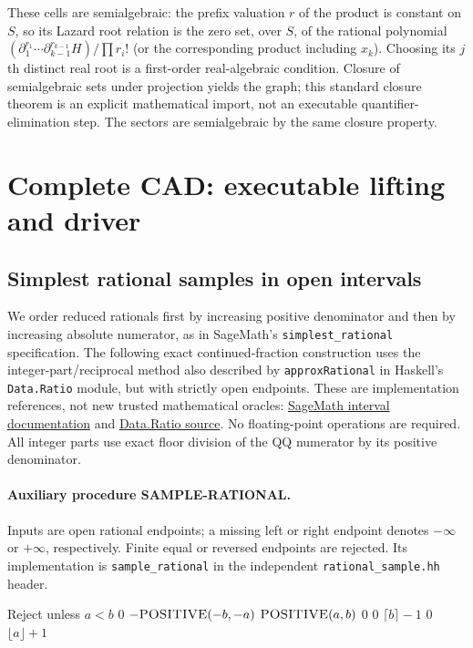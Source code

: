 \documentclass[11pt]{article}
\theoremstyle{definition}
\newcommand{\alg}[1]{\textsc{#1}}
\begin{document}
These cells are semialgebraic: the prefix valuation $r$ of the product is constant
on $S$, so its Lazard root relation is the zero set, over $S$, of the rational
polynomial $(\partial_1^{r_1}\cdots\partial_{k-1}^{r_{k-1}}H)/\prod r_i!$
(or the corresponding product including $x_k$). Choosing its $j$th distinct real
root is a first-order real-algebraic condition. Closure of semialgebraic sets under
projection yields the graph; this standard closure theorem is an explicit
mathematical import, not an executable quantifier-elimination step.
The sectors are semialgebraic by the same closure property.

\section{Complete CAD: executable lifting and driver}
\subsection{Simplest rational samples in open intervals}\label{s:sampling}
We order reduced rationals first by increasing positive denominator and then by
increasing absolute numerator, as in SageMath's \texttt{simplest\_rational}
specification. The following exact continued-fraction construction uses the
integer-part/reciprocal method also described by \texttt{approxRational} in
Haskell's \texttt{Data.Ratio} module, but with strictly open endpoints.
These are implementation references, not new trusted mathematical oracles:
\href{https://doc.sagemath.org/html/en/reference/rings_numerical/sage/rings/real_mpfi.html}{SageMath interval documentation} and
\href{https://hackage-content.haskell.org/package/base-4.7.0.1/docs/src/Data-Ratio.html}{Data.Ratio source}.
No floating-point operations are required. All integer parts use exact floor
division of the QQ numerator by its positive denominator.

\begin{samepage}
\paragraph{Auxiliary procedure SAMPLE-RATIONAL.}
Inputs are open rational endpoints; a missing left or right endpoint denotes
$-\infty$ or $+\infty$, respectively. Finite equal or reversed endpoints are
rejected. Its implementation is \texttt{sample\_rational} in the independent
\texttt{rational\_sample.hh} header.
\begin{algorithmic}[1]
 \State Reject unless $a<b$
  \State \Return $0$ \EndIf
  \State \Return $-\alg{POSITIVE}(-b,-a)$ \EndIf
 \State \Return $\alg{POSITIVE}(a,b)$
 \State \Return $0$
  \State \Return $0$ \EndIf
 \State \Return $\lceil b\rceil-1$ 
\Else
  \State \Return $0$ \EndIf
 \State \Return $\lfloor a\rfloor+1$
\EndIf
\end{algorithmic}
\end{samepage}
\end{document}
